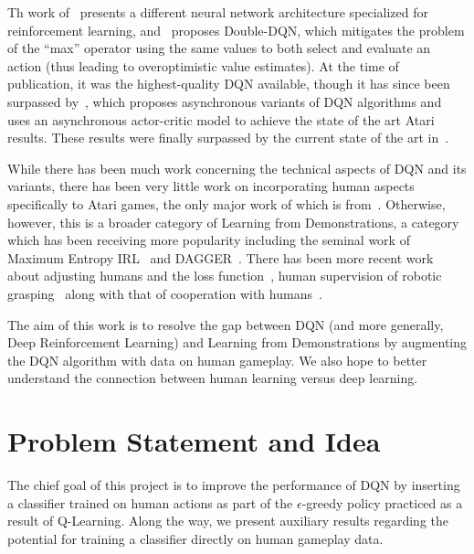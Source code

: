 \documentclass[letterpaper, 10pt, conference]{ieeeconf}
\begin{document}
Th work of~\cite{DBLP:conf/icml/WangSHHLF16} presents a different neural network
architecture specialized for reinforcement learning,
and~\cite{DBLP:conf/aaai/HasseltGS16} proposes Double-DQN, which mitigates
the problem of the ``max'' operator using the same values to both select and
evaluate an action (thus leading to overoptimistic value estimates). At the time
of publication, it was the highest-quality DQN available, though it has since
been surpassed by~\cite{DBLP:conf/icml/MnihBMGLHSK16}, which proposes
asynchronous variants of DQN algorithms and uses an asynchronous actor-critic
model to achieve the state of the art Atari results. These results were finally
surpassed by the current state of the art
in~\cite{DBLP:journals/corr/JaderbergMCSLSK16}.

While there has been much work concerning the technical aspects of DQN and its
variants, there has been very little work on incorporating human aspects
specifically to Atari games, the only major work of which is
from~\cite{DBLP:journals/corr/HosuR16}. Otherwise, however, this is a broader
category of Learning from Demonstrations, a category which has been receiving
more popularity including the seminal work of Maximum Entropy
IRL~\cite{Ziebart_2008_6055} and DAGGER~\cite{DBLP:journals/jmlr/RossGB11}.
There has been more recent work about adjusting humans and the loss
function~\cite{conf/nips/KimFPP13}, human supervision of robotic
grasping~\cite{DBLP:journals/corr/LaskeyCLMKJDG16,DBLP:dblp_conf/icra/LaskeySHMPDG16}
along with that of cooperation with humans~\cite{NIPS2016_6420}.

The aim of this work is to resolve the gap between DQN (and more generally, Deep
Reinforcement Learning) and Learning from Demonstrations by augmenting the DQN
algorithm with data on human gameplay. We also hope to better understand the
connection between human learning versus deep learning.



\section{Problem Statement and Idea}\label{sec:idea}

The chief goal of this project is to improve the performance of DQN by inserting
a classifier trained on human actions as part of the $\epsilon$-greedy policy
practiced as a result of Q-Learning. Along the way, we present auxiliary results
regarding the potential for training a classifier directly on human gameplay
data.
\end{document}
